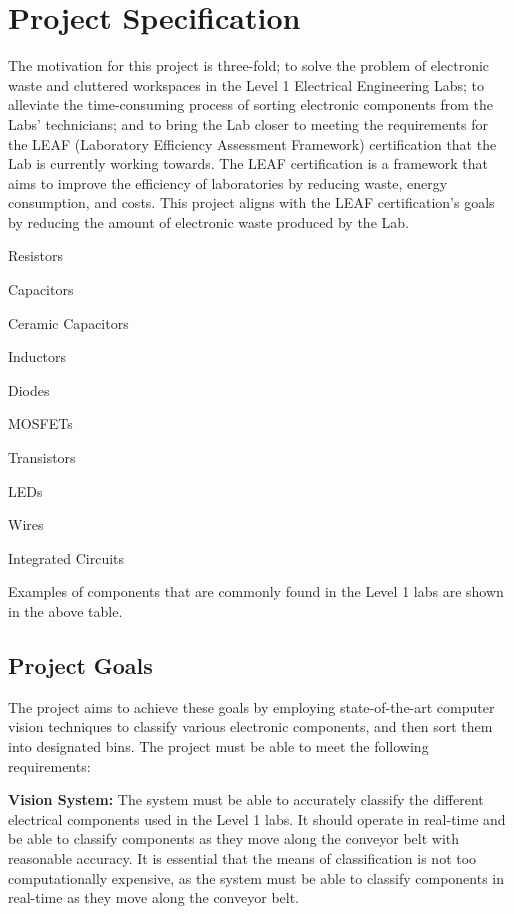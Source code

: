 \section{Project Specification}
\label{sec:project-specification}
The motivation for this project is three-fold; to solve the problem of electronic waste and cluttered workspaces in the Level 1 Electrical Engineering Labs; to alleviate the time-consuming process of sorting electronic components from the Labs' technicians; and to bring the Lab closer to meeting the requirements for the LEAF (Laboratory Efficiency Assessment Framework) certification \cite{leaf} that the Lab is currently working towards. The LEAF certification is a framework that aims to improve the efficiency of laboratories by reducing waste, energy consumption, and costs.
This project aligns with the LEAF certification's goals by reducing the amount of electronic waste produced by the Lab.

\begin{multicols}{2}
  \begin{mylist}
    \item Resistors
    \item Capacitors
    \item Ceramic Capacitors
    \item Inductors
    \item Diodes
    \item MOSFETs
    \item Transistors
    \item LEDs
    \item Wires
    \item Integrated Circuits
  \end{mylist}
\end{multicols}
Examples of components that are commonly found in the Level 1 labs are shown in the above table.

\subsection{Project Goals}
The project aims to achieve these goals by employing state-of-the-art computer vision techniques to classify various electronic components, and then sort them into designated bins. The project must be able to meet the following requirements:

\textbf{Vision System:} The system must be able to accurately classify the different electrical components used in the Level 1 labs. It should operate in real-time and be able to classify components as they move along the conveyor belt with reasonable accuracy. It is essential that the means of classification is not too computationally expensive, as the system must be able to classify components in real-time as they move along the conveyor belt.

